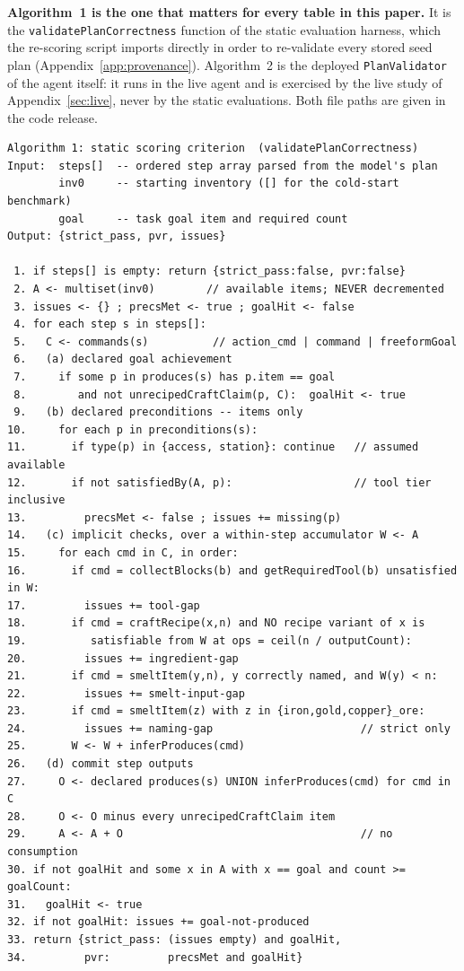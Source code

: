 \documentclass[letterpaper]{article} %
\newcommand{\appref}[1]{Appendix~\ref{#1}}
\begin{document}
\textbf{Algorithm~1 is the one that matters for every table in this paper.}
It is the \texttt{validatePlanCorrectness} function of the static evaluation
harness, which the re-scoring script imports directly in order to re-validate
every stored seed plan (\appref{app:provenance}).  Algorithm~2 is the deployed
\texttt{PlanValidator} of the agent itself: it runs in the live agent and is
exercised by the live study of \appref{sec:live}, never by the static
evaluations.  Both file paths are given in the code release.

\begin{footnotesize}
\begin{verbatim}
Algorithm 1: static scoring criterion  (validatePlanCorrectness)
Input:  steps[]  -- ordered step array parsed from the model's plan
        inv0     -- starting inventory ([] for the cold-start benchmark)
        goal     -- task goal item and required count
Output: {strict_pass, pvr, issues}

 1. if steps[] is empty: return {strict_pass:false, pvr:false}
 2. A <- multiset(inv0)        // available items; NEVER decremented
 3. issues <- {} ; precsMet <- true ; goalHit <- false
 4. for each step s in steps[]:
 5.   C <- commands(s)          // action_cmd | command | freeformGoal
 6.   (a) declared goal achievement
 7.     if some p in produces(s) has p.item == goal
 8.        and not unrecipedCraftClaim(p, C):  goalHit <- true
 9.   (b) declared preconditions -- items only
10.     for each p in preconditions(s):
11.       if type(p) in {access, station}: continue   // assumed available
12.       if not satisfiedBy(A, p):                   // tool tier inclusive
13.         precsMet <- false ; issues += missing(p)
14.   (c) implicit checks, over a within-step accumulator W <- A
15.     for each cmd in C, in order:
16.       if cmd = collectBlocks(b) and getRequiredTool(b) unsatisfied in W:
17.         issues += tool-gap
18.       if cmd = craftRecipe(x,n) and NO recipe variant of x is
19.          satisfiable from W at ops = ceil(n / outputCount):
20.         issues += ingredient-gap
21.       if cmd = smeltItem(y,n), y correctly named, and W(y) < n:
22.         issues += smelt-input-gap
23.       if cmd = smeltItem(z) with z in {iron,gold,copper}_ore:
24.         issues += naming-gap                       // strict only
25.       W <- W + inferProduces(cmd)
26.   (d) commit step outputs
27.     O <- declared produces(s) UNION inferProduces(cmd) for cmd in C
28.     O <- O minus every unrecipedCraftClaim item
29.     A <- A + O                                     // no consumption
30. if not goalHit and some x in A with x == goal and count >= goalCount:
31.   goalHit <- true
32. if not goalHit: issues += goal-not-produced
33. return {strict_pass: (issues empty) and goalHit,
34.         pvr:         precsMet and goalHit}
\end{verbatim}
\end{footnotesize}
\end{document}
